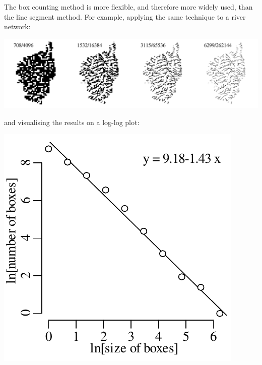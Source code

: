 The box counting method is more flexible, and therefore more widely
used, than the line segment method. For example, applying the same
technique to a river network:\medskip

\noindent\includegraphics[width=\textwidth]{../figures/Corsica.png}
\begingroup {}
\label{fig:Corsica}
\endgroup

\noindent and visualising the results on a log-log plot:

\noindent\begin{minipage}[t][][b]{.3\textwidth}
  \includegraphics[width=\textwidth]{../figures/Corsicaboxcounts.pdf}\medskip
\end{minipage}
\begin{minipage}[t][][t]{.7\textwidth}
  \label{fig:Corsicaboxcounts}
\end{minipage}

